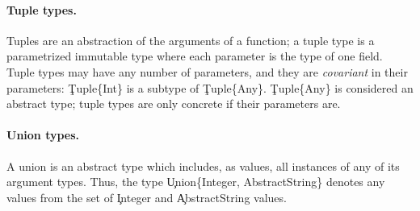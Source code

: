 \paragraph{Tuple types.}
Tuples are an abstraction of the arguments of a function; a tuple type is a
parametrized immutable type where each parameter is the type of one field.
Tuple types may have any number of parameters, and they are \emph{covariant}
in their parameters: \c{Tuple\{Int\}} is a subtype of \c{Tuple\{Any\}}.
\c{Tuple\{Any\}} is considered an abstract type; tuple types are only
concrete if their parameters are.

\paragraph{Union types.}
A union is an abstract type which includes, as values, all instances of any
of its argument types. Thus, the type \c{Union\{Integer, AbstractString\}}
denotes any values from the set of \c{Integer} and \c{AbstractString}
values.


